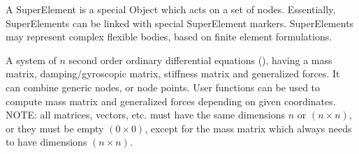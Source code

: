 \ei

%

\newpage
A SuperElement is a special Object which acts on a set of nodes. Essentially, SuperElements can be linked with special SuperElement markers. SuperElements may represent complex flexible bodies, based on finite element formulations.


\label{sec:item:ObjectGenericODE2}
A system of $n$ second order ordinary differential equations (), having a mass matrix, damping/gyroscopic matrix, stiffness matrix and generalized forces. It can combine generic nodes, or node points. User functions can be used to compute mass matrix and generalized forces depending on given coordinates. NOTE: all matrices, vectors, etc. must have the same dimensions $n$ or $(n \times n)$, or they must be empty $(0 \times 0)$, except for the mass matrix which always needs to have dimensions $(n \times n)$.
\vspace{12pt}\\

